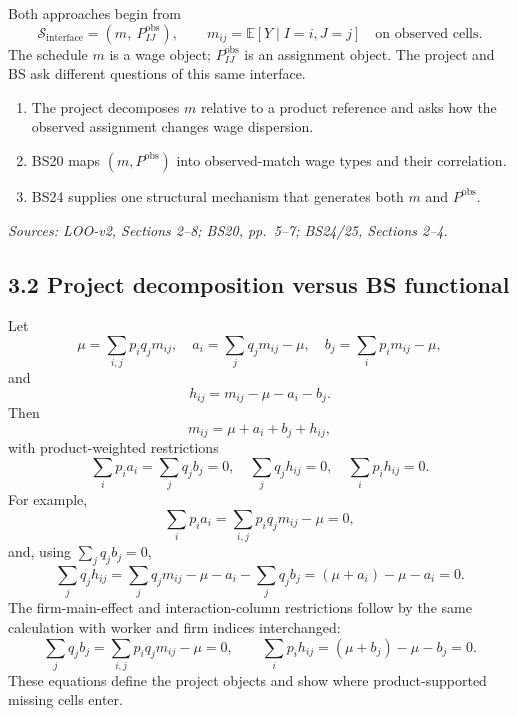 \documentclass[11pt]{article}
\begin{document}
Both approaches begin from
\[
\boxed{\mathcal S_{\mathrm{interface}}
=
\left(m,\ P^{\mathrm{obs}}_{IJ}\right),}
\qquad
m_{ij}=\mathbb E[Y\mid I=i,J=j]
\quad\text{on observed cells}.
\tag{T3.1}
\]
The schedule \(m\) is a wage object; \(P^{\mathrm{obs}}_{IJ}\) is an assignment
object.  The project and BS ask different questions of this same interface.

\begin{enumerate}
\item The project decomposes \(m\) relative to a product reference and asks
  how the observed assignment changes wage dispersion.
\item BS20 maps \((m,P^{\mathrm{obs}})\) into observed-match wage types and
  their correlation.
\item BS24 supplies one structural mechanism that generates both \(m\) and
  \(P^{\mathrm{obs}}\).
\end{enumerate}

\textit{Sources: LOO-v2, Sections 2--8; BS20, pp.\ 5--7; BS24/25,
Sections 2--4.}

\subsection{3.2 Project decomposition versus BS functional}

Let
\[
\mu=\sum_{i,j}p_iq_jm_{ij},
\quad
a_i=\sum_jq_jm_{ij}-\mu,
\quad
b_j=\sum_ip_im_{ij}-\mu,
\tag{T3.2}
\]
and
\[
h_{ij}=m_{ij}-\mu-a_i-b_j.
\tag{T3.3}
\]
Then
\[
m_{ij}=\mu+a_i+b_j+h_{ij},
\tag{T3.4}
\]
with product-weighted restrictions
\[
\sum_ip_ia_i=\sum_jq_jb_j=0,
\quad
\sum_jq_jh_{ij}=0,
\quad
\sum_ip_ih_{ij}=0.
\tag{T3.5}
\]
For example,
\[
\sum_ip_ia_i
=
\sum_{i,j}p_iq_jm_{ij}-\mu
=0,
\tag{T3.5a}
\]
and, using \(\sum_jq_jb_j=0\),
\[
\sum_jq_jh_{ij}
=
\sum_jq_jm_{ij}-\mu-a_i-\sum_jq_jb_j
=
(\mu+a_i)-\mu-a_i
=0.
\tag{T3.5b}
\]
The firm-main-effect and interaction-column restrictions follow by the same
calculation with worker and firm indices interchanged:
\[
\sum_jq_jb_j
=
\sum_{i,j}p_iq_jm_{ij}-\mu
=0,
\qquad
\sum_ip_ih_{ij}
=
(\mu+b_j)-\mu-b_j
=0.
\tag{T3.5c}
\]
These equations define the project objects and show where product-supported
missing cells enter.
\end{document}
